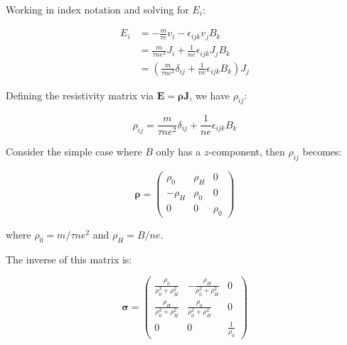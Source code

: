 \documentclass[12pt]{article}
\begin{document}
Working in index notation and solving for $E_{i}$:

\begin{equation}
    \begin{split}
        E_{i} &= -\frac{m}{\tau e} v_{i} - \epsilon_{ijk} v_{j} B_{k} \\
        &= \frac{m}{\tau n e^{2}} J_{i} + \frac{1}{ne} \epsilon_{ijk} J_{j} B_{k} \\
        &= \left( \frac{m}{\tau n e^{2}} \delta_{ij} + \frac{1}{ne} \epsilon_{ijk} B_{k} \right) J_{j}
    \end{split}
\end{equation}

Defining the resistivity matrix via $\mathbf{E} = \mathbf{\rho} \mathbf{J}$, we have $\rho_{ij}$:

\begin{equation}
    \rho_{ij} = \frac{m}{\tau n e^{2}} \delta_{ij} + \frac{1}{ne} \epsilon_{ijk} B_{k}
\end{equation}

Consider the simple case where $B$ only has a $z$-component, then $\rho_{ij}$ becomes:

\begin{equation}
    \mathbf{\rho} =
    \begin{pmatrix}
        \rho_{0}  & \rho_{H} & 0        \\
        -\rho_{H} & \rho_{0} & 0        \\
        0         & 0        & \rho_{0}
    \end{pmatrix}
\end{equation}

where $\rho_{0} = m/\tau ne^{2}$ and $\rho_{H} = B/ne$.

The inverse of this matrix is:

\begin{equation}
    \mathbf{\sigma} =
    \begin{pmatrix}
        \frac{\rho_{0}}{\rho_{0}^{2} + \rho_{H}^{2}} & -\frac{\rho_{H}}{\rho_{0}^{2} + \rho_{H}^{2}} & 0                  \\
        \frac{\rho_{H}}{\rho_{0}^{2} + \rho_{H}^{2}} & \frac{\rho_{0}}{\rho_{0}^{2} + \rho_{H}^{2}}  & 0                  \\
        0                                            & 0                                             & \frac{1}{\rho_{0}}
    \end{pmatrix}
\end{equation}
\end{document}
